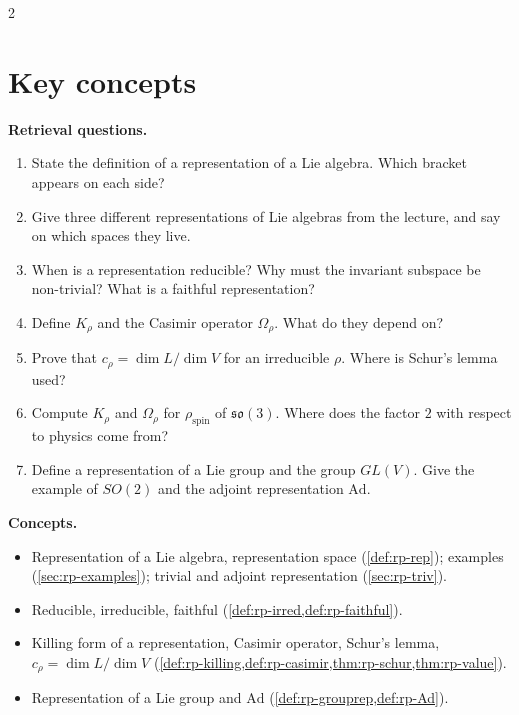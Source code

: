 \begin{paracol}{2}
\section*{Key concepts}
\begin{keyconcepts}
\textbf{Retrieval questions.}
\begin{enumerate}
  \item State the definition of a representation of a Lie algebra. Which bracket appears on each side?
  \item Give three different representations of Lie algebras from the lecture, and say on which spaces they live.
  \item When is a representation reducible? Why must the invariant subspace be non-trivial? What is a faithful representation?
  \item Define $K_\rho$ and the Casimir operator $\Omega_\rho$. What do they depend on?
  \item Prove that $c_\rho=\dim L/\dim V$ for an irreducible $\rho$. Where is Schur's lemma used?
  \item Compute $K_\rho$ and $\Omega_\rho$ for $\rho_{\mathrm{spin}}$ of $\mathfrak{so}(3)$. Where does the factor $2$ with respect to physics come from?
  \item Define a representation of a Lie group and the group $GL(V)$. Give the example of $SO(2)$ and the adjoint representation $\mathrm{Ad}$.
\end{enumerate}
\textbf{Concepts.}
\begin{itemize}
  \item Representation of a Lie algebra, representation space (\cref{def:rp-rep}); examples (\cref{sec:rp-examples}); trivial and adjoint representation (\cref{sec:rp-triv}).
  \item Reducible, irreducible, faithful (\cref{def:rp-irred,def:rp-faithful}).
  \item Killing form of a representation, Casimir operator, Schur's lemma, $c_\rho=\dim L/\dim V$ (\cref{def:rp-killing,def:rp-casimir,thm:rp-schur,thm:rp-value}).
  \item Representation of a Lie group and $\mathrm{Ad}$ (\cref{def:rp-grouprep,def:rp-Ad}).
\end{itemize}
\end{keyconcepts}

\flushside
\end{paracol}
